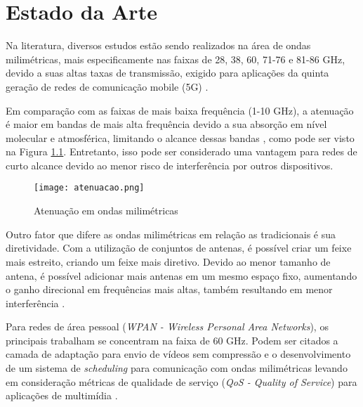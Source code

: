 \chapter{Estado da Arte}



Na literatura, diversos estudos estão sendo realizados na área de ondas milimétricas, mais especificamente nas faixas de 28, 38, 60, 71-76 e 81-86 GHz, devido a suas altas taxas de transmissão, exigido para aplicações da quinta geração de redes de comunicação mobile (5G) \cite{8567053}.

Em comparação com as faixas de mais baixa frequência (1-10 GHz), a atenuação é maior em bandas de mais alta frequência devido a sua absorção em nível molecular e atmosférica, limitando o alcance dessas bandas \cite{ichkov2017potentials}, como pode ser visto na Figura \ref{atenuacao}. Entretanto, isso pode ser considerado uma vantagem para redes de curto alcance devido ao menor risco de interferência por outros dispositivos.

\begin{figure}[htbp]
    \centering
    \caption{Atenuação em ondas milimétricas}
    \texttt{[image: atenuacao.png]}

    \centering
    \label{atenuacao}
\end{figure}

Outro fator que difere as ondas milimétricas em relação as tradicionais é sua diretividade. Com a utilização de conjuntos de antenas, é possível criar um feixe mais estreito, criando um feixe mais diretivo. Devido ao menor tamanho de antena, é possível adicionar mais antenas em um mesmo espaço fixo, aumentando o ganho direcional em frequências mais altas, também resultando em menor interferência \cite{ichkov2017potentials}.

Para redes de área pessoal (\textit{WPAN - Wireless Personal Area Networks}), os principais trabalham se concentram na faixa de 60 GHz. Podem ser citados a camada de adaptação para envio de vídeos sem compressão \cite{7398126} e o desenvolvimento de um sistema de \textit{scheduling} para comunicação com ondas milimétricas levando em consideração métricas de qualidade de serviço (\textit{QoS - Quality of Service}) para aplicações de multimídia \cite{7010539}.

